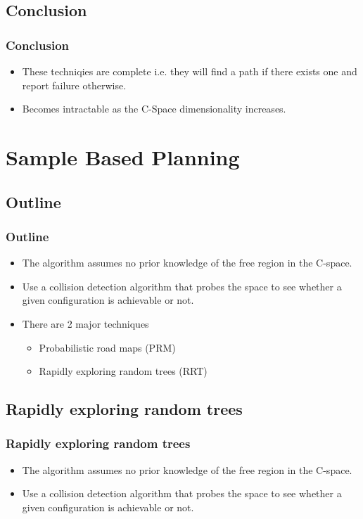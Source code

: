 \documentclass{beamer}
\begin{document}
\subsection{Conclusion}
\begin{frame}
\frametitle{Conclusion}
\begin{itemize}
\item These techniqies are complete i.e. they will find a path if there exists one and report failure otherwise.
\item Becomes intractable as the C-Space dimensionality increases.
\end{itemize}
\end{frame}
\section{Sample Based Planning}
\subsection{Outline}
\begin{frame}
\frametitle{Outline}
\begin{itemize}
\item The algorithm assumes no prior knowledge of the free region in the C-space.
\item Use a collision detection algorithm that probes the space to see whether a given configuration is achievable or not. 
\item There are 2 major techniques
\begin{itemize}
\item Probabilistic road maps (PRM)
\item Rapidly exploring random trees (RRT)
\end{itemize}
\end{itemize}
\end{frame}
\subsection{Rapidly exploring random trees}
\begin{frame}
\frametitle{Rapidly exploring random trees}
\begin{itemize}
\item The algorithm assumes no prior knowledge of the free region in the C-space.
\item Use a collision detection algorithm that probes the space to see whether a given configuration is achievable or not. 
\end{itemize}
\end{frame}
\end{document}
